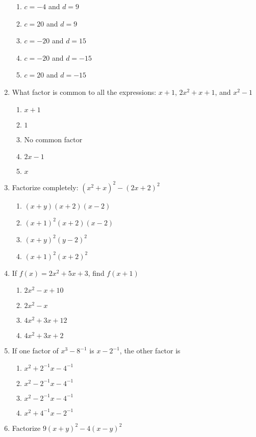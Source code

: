 \begin{multicols}{2}
\begin{enumerate}[label={\arabic*.}]
	\begin{enumerate}[label={\Alph*.}]
	\item \(c = -4\) and \(d = 9\)
	\item \(c = 20\) and \(d  = 9\)
	\item \(c = -20\) and \(d = 15\)
	\item \(c = -20\) and \(d = -15\)
	\item \(c = 20\) and \(d = -15\)
	\end{enumerate}
\item What factor is common to all the expressions: \(x+1\), \(2{x}^{2}+x+1\), and \({x}^{2}-1\)
	\begin{enumerate}[label={\Alph*.}]
	\item \(x + 1\)
	\item \(1\)
	\item No common factor
	\item \(2x - 1\)
	\item \(x\)
	\end{enumerate}
\item Factorize completely: \(({x}^{2}+x)^2-(2x+2)^2\)
	\begin{enumerate}[label={\Alph*.}]
	\item \((x+y)(x+2)(x-2)\)
	\item \((x+1)^2(x+2)(x-2)\)
	\item \((x+y)^2(y-2)^2\)
	\item \((x+1)^2(x+2)^2\)
	\end{enumerate}
\item If \(f(x) = 2{x}^{2}+5x+3\), find \(f(x+1)\)
	\begin{enumerate}[label={\Alph*.}]
	\item \(2{x}^{2} - x + 10\)
	\item \(2{x}^{2} - x\)
	\item \(4{x}^{2} + 3x + 12\)
	\item \(4{x}^{2} + 3x + 2\)
	\end{enumerate}
\item If one factor of \({x}^{3}-8^{-1}\) is \(x-2^{-1}\), the other factor is
	\begin{enumerate}[label={\Alph*.}]
	\item \({x}^{2}+2^{-1}x-4^{-1}\)
	\item \({x}^{2}-2^{-1}x-4^{-1}\)
	\item \({x}^{2}-2^{-1}x-4^{-1}\)
	\item \({x}^{2}+4^{-1}x-2^{-1}\)
	\end{enumerate}
\item Factorize \(9(x+y)^2 - 4(x-y)^2\)

\end{enumerate}
\end{multicols}
